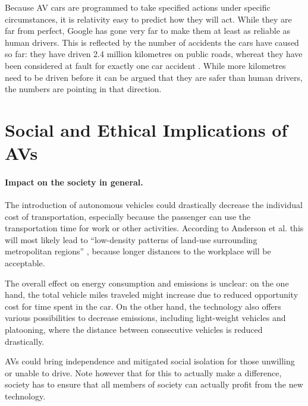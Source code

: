 \documentclass[11pt]{article}
\begin{document}
Because AV cars are programmed to take specified actions under specific circumstances, it is relativity easy to predict how they will act. While they are far from perfect, Google has gone very far to make them at least as reliable as human drivers. This is reflected by the number of accidents the cars have caused so far: they have driven 2.4 million kilometres on public roads, whereat they have been considered at fault for exactly one car accident \cite{chrisurmson2016}. While more kilometres need to be driven before it can be argued that they are safer than human drivers, the numbers are pointing in that direction. 

\section{Social and Ethical Implications of AVs}
\paragraph{Impact on the society in general.}
The introduction of autonomous vehicles could drastically decrease the individual cost of transportation, especially because the passenger can use the transportation time for work or other activities. According to Anderson et al. this will most likely lead to ``low-density patterns of land-use surrounding metropolitan regions'' \cite{Anderson2014rand}, because longer distances to the workplace will be acceptable.

The overall effect on energy consumption and emissions is unclear: on the one hand, the total vehicle miles traveled might increase due to reduced opportunity cost for time spent in the car. On the other hand, the technology also offers various possibilities to decrease emissions, including light-weight vehicles and platooning, where the distance between consecutive vehicles is reduced drastically.

AVs could bring independence and mitigated social isolation for those unwilling or unable to drive. Note however that for this to actually make a difference, society has to ensure that all members of society can actually profit from the new technology.
\end{document}
